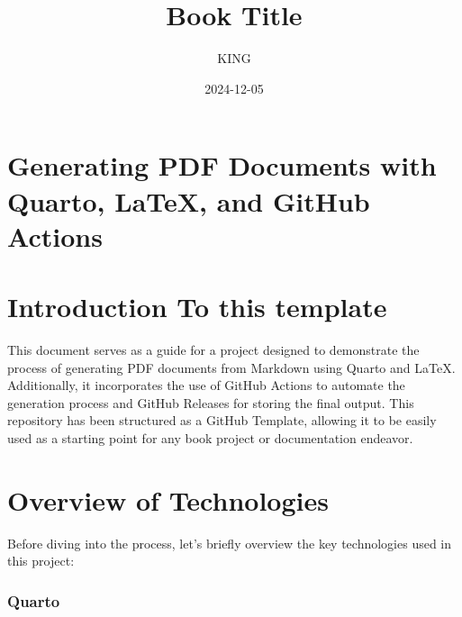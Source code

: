 \documentclass[
  letterpaper,
  paper=6in:9in,
  pagesize=pdftex,
  headinclude=on,
  footinclude=on,
  12pt]{scrbook}
\title{Book Title}
\author{KING}
\date{2024-12-05}
\renewcommand*\contentsname{Inhaltsverzeichnis}
\newcommand\contentsname{Inhaltsverzeichnis}
\begin{document}
\frontmatter
\maketitle


\renewcommand*\contentsname{Inhaltsverzeichnis}
{
\setcounter{tocdepth}{2}
\tableofcontents
}

\mainmatter
{}

\chapter*{Generating PDF Documents with Quarto, LaTeX, and GitHub
Actions}\label{generating-pdf-documents-with-quarto-latex-and-github-actions}



\chapter{Introduction To this
template}\label{introduction-to-this-template}

This document serves as a guide for a project designed to demonstrate
the process of generating PDF documents from Markdown using Quarto and
LaTeX. Additionally, it incorporates the use of GitHub Actions to
automate the generation process and GitHub Releases for storing the
final output. This repository has been structured as a GitHub Template,
allowing it to be easily used as a starting point for any book project
or documentation endeavor.


\chapter{Overview of Technologies}\label{overview-of-technologies}

Before diving into the process, let's briefly overview the key
technologies used in this project:

\subsection{Quarto}\label{quarto}
\end{document}

